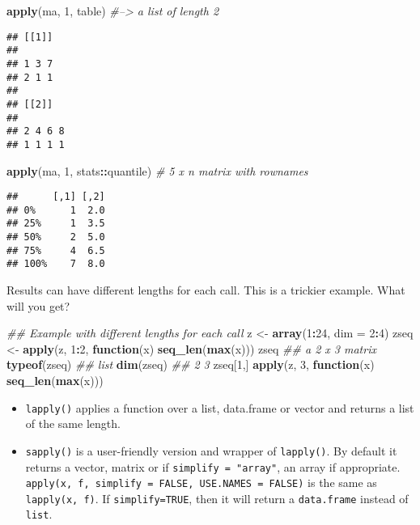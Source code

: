 \documentclass[
]{article}
\newenvironment{Shaded}{\begin{snugshade}}{\end{snugshade}}
\newcommand{\CommentTok}[1]{\textcolor[rgb]{0.56,0.35,0.01}{\textit{#1}}}
\newcommand{\ControlFlowTok}[1]{\textcolor[rgb]{0.13,0.29,0.53}{\textbf{#1}}}
\newcommand{\DataTypeTok}[1]{\textcolor[rgb]{0.13,0.29,0.53}{#1}}
\newcommand{\DecValTok}[1]{\textcolor[rgb]{0.00,0.00,0.81}{#1}}
\newcommand{\KeywordTok}[1]{\textcolor[rgb]{0.13,0.29,0.53}{\textbf{#1}}}
\newcommand{\NormalTok}[1]{#1}
\newcommand{\OperatorTok}[1]{\textcolor[rgb]{0.81,0.36,0.00}{\textbf{#1}}}
\newcommand{\StringTok}[1]{\textcolor[rgb]{0.31,0.60,0.02}{#1}}
\providecommand{\tightlist}{%
  \setlength{\itemsep}{0pt}\setlength{\parskip}{0pt}}
\begin{document}
\begin{Shaded}
\begin{Highlighting}[]
\KeywordTok{apply}\NormalTok{(ma, }\DecValTok{1}\NormalTok{, table)  }\CommentTok{#--> a list of length 2}
\end{Highlighting}
\end{Shaded}

\begin{verbatim}
## [[1]]
## 
## 1 3 7 
## 2 1 1 
## 
## [[2]]
## 
## 2 4 6 8 
## 1 1 1 1
\end{verbatim}

\begin{Shaded}
\begin{Highlighting}[]
\KeywordTok{apply}\NormalTok{(ma, }\DecValTok{1}\NormalTok{, stats}\OperatorTok{::}\NormalTok{quantile) }\CommentTok{# 5 x n matrix with rownames}
\end{Highlighting}
\end{Shaded}

\begin{verbatim}
##      [,1] [,2]
## 0%      1  2.0
## 25%     1  3.5
## 50%     2  5.0
## 75%     4  6.5
## 100%    7  8.0
\end{verbatim}

Results can have different lengths for each call. This is a trickier
example. What will you get?

\begin{Shaded}
\begin{Highlighting}[]
\CommentTok{## Example with different lengths for each call}
\NormalTok{z <-}\StringTok{ }\KeywordTok{array}\NormalTok{(}\DecValTok{1}\OperatorTok{:}\DecValTok{24}\NormalTok{, }\DataTypeTok{dim =} \DecValTok{2}\OperatorTok{:}\DecValTok{4}\NormalTok{)}
\NormalTok{zseq <-}\StringTok{ }\KeywordTok{apply}\NormalTok{(z, }\DecValTok{1}\OperatorTok{:}\DecValTok{2}\NormalTok{, }\ControlFlowTok{function}\NormalTok{(x) }\KeywordTok{seq_len}\NormalTok{(}\KeywordTok{max}\NormalTok{(x)))}
\NormalTok{zseq         }\CommentTok{## a 2 x 3 matrix}
\KeywordTok{typeof}\NormalTok{(zseq) }\CommentTok{## list}
\KeywordTok{dim}\NormalTok{(zseq) }\CommentTok{## 2 3}
\NormalTok{zseq[}\DecValTok{1}\NormalTok{,]}
\KeywordTok{apply}\NormalTok{(z, }\DecValTok{3}\NormalTok{, }\ControlFlowTok{function}\NormalTok{(x) }\KeywordTok{seq_len}\NormalTok{(}\KeywordTok{max}\NormalTok{(x)))}
\end{Highlighting}
\end{Shaded}

\begin{itemize}
\tightlist
\item
  \texttt{lapply()} applies a function over a list, data.frame or vector
  and returns a list of the same length.
\item
  \texttt{sapply()} is a user-friendly version and wrapper of
  \texttt{lapply()}. By default it returns a vector, matrix or if
  \texttt{simplify\ =\ "array"}, an array if appropriate.
  \texttt{apply(x,\ f,\ simplify\ =\ FALSE,\ USE.NAMES\ =\ FALSE)} is
  the same as \texttt{lapply(x,\ f)}. If \texttt{simplify=TRUE}, then it
  will return a \texttt{data.frame} instead of \texttt{list}.
\end{itemize}
\end{document}

